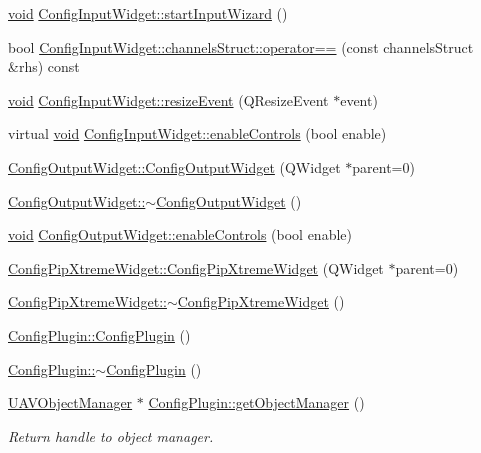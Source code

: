 \begin{DoxyCompactItemize}
\item 
\hyperlink{group___u_a_v_objects_plugin_ga444cf2ff3f0ecbe028adce838d373f5c}{void} \hyperlink{group___config_plugin_gaad3d50c5993be3628b91188aad094505}{Config\-Input\-Widget\-::start\-Input\-Wizard} ()
\item 
bool \hyperlink{group___config_plugin_gaa1b84821bb68ba5f3e6cdc312899f4dd}{Config\-Input\-Widget\-::channels\-Struct\-::operator==} (const channels\-Struct \&rhs) const 
\item 
\hyperlink{group___u_a_v_objects_plugin_ga444cf2ff3f0ecbe028adce838d373f5c}{void} \hyperlink{group___config_plugin_ga46ca6ec855581471ed30c902b43371cf}{Config\-Input\-Widget\-::resize\-Event} (Q\-Resize\-Event $\ast$event)
\item 
virtual \hyperlink{group___u_a_v_objects_plugin_ga444cf2ff3f0ecbe028adce838d373f5c}{void} \hyperlink{group___config_plugin_ga39ced7c878bb56024b9bdd2bdb90d68f}{Config\-Input\-Widget\-::enable\-Controls} (bool enable)
\item 
\hyperlink{group___config_plugin_gae97fadc2217af00fbdcd40904dffdfcd}{Config\-Output\-Widget\-::\-Config\-Output\-Widget} (Q\-Widget $\ast$parent=0)
\item 
\hyperlink{group___config_plugin_ga583ddecf4689ec9d73a39ac36d47beb5}{Config\-Output\-Widget\-::$\sim$\-Config\-Output\-Widget} ()
\item 
\hyperlink{group___u_a_v_objects_plugin_ga444cf2ff3f0ecbe028adce838d373f5c}{void} \hyperlink{group___config_plugin_ga8c6d4684111bd4a10d4940a803faf852}{Config\-Output\-Widget\-::enable\-Controls} (bool enable)
\item 
\hyperlink{group___config_plugin_ga93976625b77842e32b44100f87cad868}{Config\-Pip\-Xtreme\-Widget\-::\-Config\-Pip\-Xtreme\-Widget} (Q\-Widget $\ast$parent=0)
\item 
\hyperlink{group___config_plugin_ga225924f55de51a2a536ad41dba22fbc2}{Config\-Pip\-Xtreme\-Widget\-::$\sim$\-Config\-Pip\-Xtreme\-Widget} ()
\item 
\hyperlink{group___config_plugin_ga7d360f4053aa997f911f4b8d5b9beddc}{Config\-Plugin\-::\-Config\-Plugin} ()
\item 
\hyperlink{group___config_plugin_gabe1cf1e86b64f31b77b147614d70cb2d}{Config\-Plugin\-::$\sim$\-Config\-Plugin} ()
\item 
\hyperlink{class_u_a_v_object_manager}{U\-A\-V\-Object\-Manager} $\ast$ \hyperlink{group___config_plugin_ga4b72a360021dcddf63bd9dc3566930bf}{Config\-Plugin\-::get\-Object\-Manager} ()
\begin{DoxyCompactList}\small\item\em Return handle to object manager. \end{DoxyCompactList}\item 

\end{DoxyCompactItemize}
